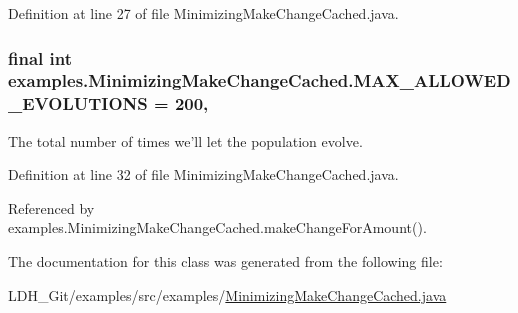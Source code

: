 Definition at line 27 of file Minimizing\-Make\-Change\-Cached.\-java.

\hypertarget{classexamples_1_1_minimizing_make_change_cached_a9ba370739f88cda7103ad16aa1792f16}{
\subsubsection[{M\-A\-X\-\_\-\-A\-L\-L\-O\-W\-E\-D\-\_\-\-E\-V\-O\-L\-U\-T\-I\-O\-N\-S}]{\setlength{\rightskip}{0pt plus 5cm}final int examples.\-Minimizing\-Make\-Change\-Cached.\-M\-A\-X\-\_\-\-A\-L\-L\-O\-W\-E\-D\-\_\-\-E\-V\-O\-L\-U\-T\-I\-O\-N\-S = 200\hspace{0.3cm}{\ttfamily [static]}, {\ttfamily [private]}}}\label{classexamples_1_1_minimizing_make_change_cached_a9ba370739f88cda7103ad16aa1792f16}
The total number of times we'll let the population evolve. 

Definition at line 32 of file Minimizing\-Make\-Change\-Cached.\-java.



Referenced by examples.\-Minimizing\-Make\-Change\-Cached.\-make\-Change\-For\-Amount().



The documentation for this class was generated from the following file\-:\begin{DoxyCompactItemize}
\item 
L\-D\-H\-\_\-\-Git/examples/src/examples/\hyperlink{_minimizing_make_change_cached_8java}{Minimizing\-Make\-Change\-Cached.\-java}\end{DoxyCompactItemize}
